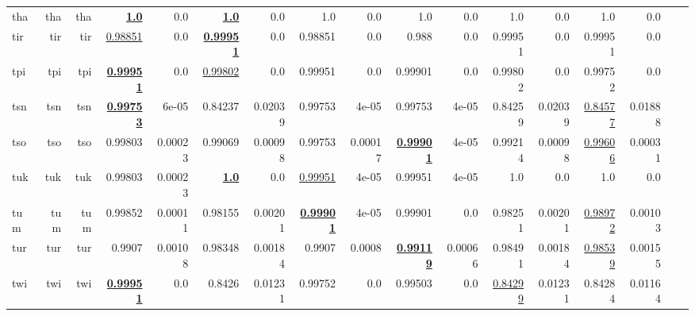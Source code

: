 \documentclass[11pt]{article}
\begin{document}
\begin{table*}[h]
{\begin{tabular}{lrrrrrrrrrrrrrrrr}
tha         & tha         & tha         & \textbf{\underline{1.0}}         & 0.0         & \textbf{\underline{1.0}}         & 0.0         & 1.0         & 0.0         & 1.0         & 0.0         & 1.0         & 0.0         & 1.0         & 0.0         \\
tir         & tir         & tir         & \underline{0.98851}         & 0.0         & \textbf{\underline{0.99951}}         & 0.0         & 0.98851         & 0.0         & 0.988         & 0.0         & 0.99951         & 0.0         & 0.99951         & 0.0         \\
tpi         & tpi         & tpi         & \textbf{\underline{0.99951}}         & 0.0         & \underline{0.99802}         & 0.0         & 0.99951         & 0.0         & 0.99901         & 0.0         & 0.99802         & 0.0         & 0.99752         & 0.0         \\
tsn         & tsn         & tsn         & \textbf{\underline{0.99753}}         & 6e-05         & 0.84237         & 0.02039         & 0.99753         & 4e-05         & 0.99753         & 4e-05         & 0.84259         & 0.02039         & \underline{0.84577}         & 0.01888         \\
tso         & tso         & tso         & 0.99803         & 0.00023         & 0.99069         & 0.00098         & 0.99753         & 0.00017         & \textbf{\underline{0.99901}}         & 4e-05         & 0.99214         & 0.00098         & \underline{0.99606}         & 0.00031         \\
tuk         & tuk         & tuk         & 0.99803         & 0.00023         & \textbf{\underline{1.0}}         & 0.0         & \underline{0.99951}         & 4e-05         & 0.99951         & 4e-05         & 1.0         & 0.0         & 1.0         & 0.0         \\
tum         & tum         & tum         & 0.99852         & 0.00011         & 0.98155         & 0.00201         & \textbf{\underline{0.99901}}         & 4e-05         & 0.99901         & 0.0         & 0.98251         & 0.00201         & \underline{0.98972}         & 0.00103         \\
tur         & tur         & tur         & 0.9907         & 0.00108         & 0.98348         & 0.00184         & 0.9907         & 0.0008         & \textbf{\underline{0.99119}}         & 0.00066         & 0.98491         & 0.00184         & \underline{0.98539}         & 0.00155         \\
twi         & twi         & twi         & \textbf{\underline{0.99951}}         & 0.0         & 0.8426         & 0.01231         & 0.99752         & 0.0         & 0.99503         & 0.0         & \underline{0.84299}         & 0.01231         & 0.84284         & 0.01164         \\

\end{tabular}}
\end{table*}
\end{document}
